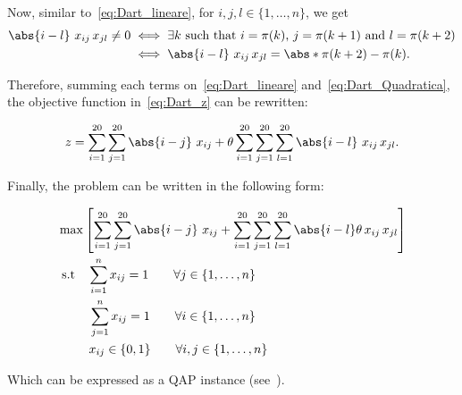Now, similar to~\eqref{eq:Dart_lineare}, for $i,j,l\in \{1,\dots,n\}$, we get
\small
\begin{equation}
	\label{eq:Dart_Quadratica}
\begin{split}	
	\abs{i-l} \ x_{ij} \, x_{jl}\neq 0 
	&\iff \text{$\exists k$ such that  $i=\pi(k)$, $j=\pi(k+1)$ and $l=\pi(k+2)$}\\
	&\iff \abs{i-l} \ x_{ij} \, x_{jl} = \abs*{\pi(k+2)-\pi(k)}	.
\end{split}	
\end{equation}
\normalsize


Therefore, summing each terms on~\eqref{eq:Dart_lineare} and~\eqref{eq:Dart_Quadratica}, the objective function in~\eqref{eq:Dart_z} can be rewritten:

\begin{gather}
z =	\sum_{i=1}^{20}\sum_{j=1}^{20}\abs{i-j} \ x_{ij} +\theta\sum_{i=1}^{20}\sum_{j=1}^{20}\sum_{l=1}^{20}\abs{i-l} \ x_{ij}\, x_{jl}.
\end{gather}

\noindent Finally, the problem can be written in the following form:

\begin{equation}
	\begin{split}
&\max \left[ \sum_{i=1}^{20}\sum_{j=1}^{20} \abs{i-j} \  x_{ij} + \sum_{i=1}^{20}\sum_{j=1}^{20}\sum_{l=1}^{20} \abs{i-l} \theta  \, x_{ij}\,x_{jl}\right]\\
&\text{ s.t} \quad  \sum_{i=1}^n x_{ij} = 1 \qquad \forall j\in\{1,\dots,n\}\\
&\phantom{\text{ s.a}} \quad   \sum_{j=1}^n x_{ij} = 1 \qquad \forall i\in \{1,\dots,n \} \\
&\phantom{\text{ s.a}} \quad  x_{ij}\in \{0,1\} \qquad \forall i,j \in \{1,\dots,n \}  \\
\end{split}
\end{equation}


Which can be expressed as a QAP instance (see~\cite[p. 116]{Eiselt1991}).
